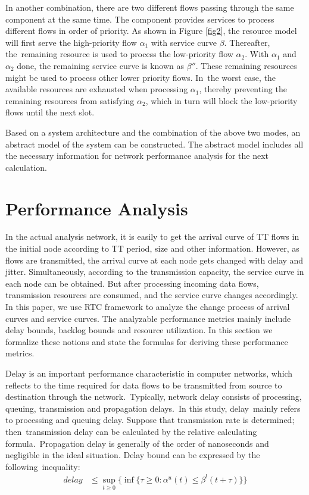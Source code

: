 \documentclass[electronics,article,accept,moreauthors,pdftex]{Definitions/mdpi}
\begin{document}
In another combination, there are two different flows passing through the same component at the same time. The component provides services to process different flows in order of priority. As shown in {Figure} \ref{fig2}, the resource model will first serve the high-priority flow $\alpha_1$ with service curve $\beta$. Thereafter, the~remaining resource is used to process the low-priority flow $\alpha_2$. With $\alpha_1$ and $\alpha_2$ done, the remaining service curve is known as $\beta''$. These remaining resources might be used to process other lower priority flows. In~the worst case, the available resources are exhausted when processing $\alpha_1$, thereby preventing the remaining resources from satisfying $\alpha_2$, which in turn will block the low-priority flows until the next slot.

Based on a system architecture and the combination of the above two modes, an abstract model of the system can be constructed. The abstract model includes all the necessary information for network performance analysis for the next calculation.

\section{Performance Analysis}
\label{analysis}

In the actual analysis network, it is easily to get the arrival curve of TT flows in the initial node according to TT period, size and other information. However, as flows are transmitted,  the arrival curve at each node gets changed with delay and jitter. Simultaneously, according to the transmission capacity, the service curve in each node can be obtained. But after processing incoming data flows, transmission resources are consumed, and the service curve changes accordingly. In this paper, we use RTC framework to analyze the change process of arrival curves and service curves. The analyzable performance metrics mainly include delay bounds, backlog bounds and resource utilization. In this section we formalize these notions and state the formulas for deriving these performance metrics.

Delay is an important performance characteristic in computer networks, which reflects to the time required for data flows to be transmitted from source to destination through the network.~Typically, network delay consists of processing, queuing, transmission and propagation delays.~{In this study, delay~mainly refers to processing and queuing delay. Suppose that transmission rate is determined; then~transmission delay can be calculated by the relative calculating formula.~Propagation delay is generally of the order of nanoseconds and negligible in the ideal situation.} Delay bound can be expressed by the following~inequality:
 \begin{equation}
   \begin{aligned}
   delay &\leq \sup_{t \ge 0} \{\inf\{\tau \ge 0:\alpha^u(t) \leq \beta^l(t+\tau)\}\}\\
   \end{aligned}
\end{equation}
\end{document}
